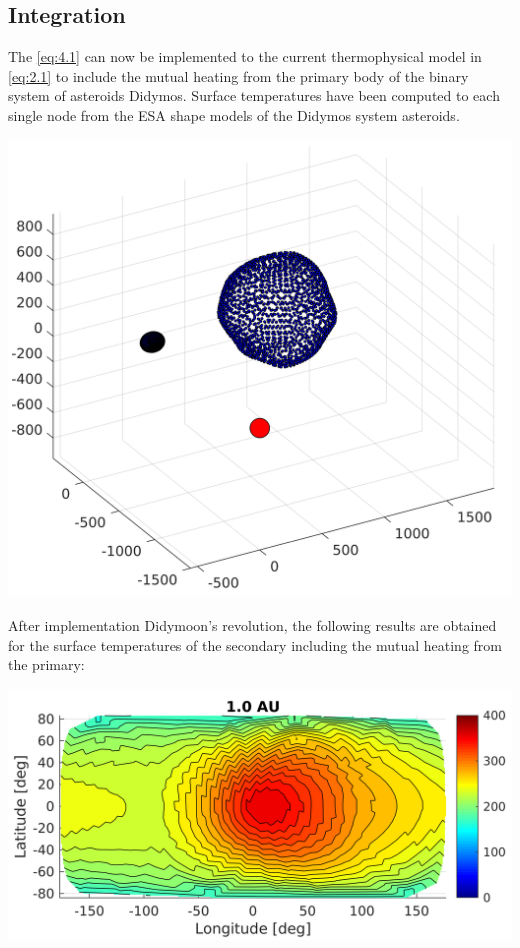 \subsection{Integration}
The \autoref{eq:4.1} can now be implemented to the current thermophysical model in \autoref{eq:2.1} to include the mutual heating from the primary body of the binary system of asteroids Didymos. Surface temperatures have been computed to each single node from the ESA shape models of the Didymos system asteroids.
\begin{center}
    \includegraphics[width=0.9\linewidth]{rsc/mutual_model.png}
    \label{fig:4.2}
\end{center}
After implementation Didymoon's revolution, the following results are obtained for the surface temperatures of the secondary including the mutual heating from the primary:
\begin{center}
    \includegraphics[width=\linewidth]{rsc/mutual.png}
    \label{fig:4.3}
\end{center}
